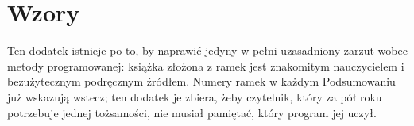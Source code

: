 %
%
%

\chapter{Wzory}
\label{app:C}

\noindent
Ten dodatek istnieje po to, by naprawić jedyny w pełni uzasadniony zarzut wobec
metody programowanej: książka złożona z ramek jest znakomitym nauczycielem i
bezużytecznym podręcznym źródłem. Numery ramek w każdym Podsumowaniu już
wskazują wstecz; ten dodatek je zbiera, żeby czytelnik, który za pół roku
potrzebuje jednej tożsamości, nie musiał pamiętać, który program jej uczył.

\medskip
\resultsbody
